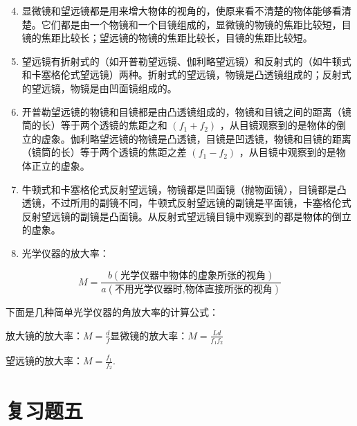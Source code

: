 \begin{enumerate}
\setcounter{enumi}{3}
\item
  显微镜和望远镜都是用来增大物体的视角的，使原来看不清楚的物体能够看清楚。它们都是由一个物镜和一个目镜组成的，显微镜的物镜的焦距比较短，目镜的焦距比较长；望远镜的物镜的焦距比较长，目镜的焦距比较短。
\item
  望远镜有折射式的（如开普勒望远镜、伽利略望远镜）和反射式的（如牛顿式和卡塞格伦式望远镜）两种。折射式的望远镜，物镜是凸透镜组成的；反射式的望远镜，物镜是由凹面镜组成的。
\item
  开普勒望远镜的物镜和目镜都是由凸透镜组成的，物镜和目镜之间的距离（镜筒的长）等于两个透镜的焦距之和
  \((f_{1}+f_{2})\)
  ，从目镜观察到的是物体的倒立的虚象。伽利略望远镜的物镜是凸透镜，目镜是凹透镜，物镜和目镜的距离（镜筒的长）等于两个透镜的焦距之差
  \((f_{1}-f_{2})\) ，从目镜中观察到的是物体正立的虚象。
\item
  牛顿式和卡塞格伦式反射望远镜，物镜都是凹面镜（抛物面镜），目镜都是凸透镜，不过所用的副镜不同，牛顿式反射望远镜的副镜是平面镜，卡塞格伦式反射望远镜的副镜是凸面镜。从反射式望远镜目镜中观察到的都是物体的倒立的虚象。
\item
  光学仪器的放大率：
\end{enumerate}

\[
M = \frac {b (\text{光学仪器中物体的虚象所张的视角})}{a (\text{不用光学仪器时,物体直接所张的视角})}
\]

下面是几种简单光学仪器的角放大率的计算公式：

放大镜的放大率：\(M=\frac{d}{f}\)显微镜的放大率：\(M=\frac{Ld}{f_{1}f_{2}}\)

望远镜的放大率：\(M = \frac{f_1}{f_2}\).

\section{复习题五}

